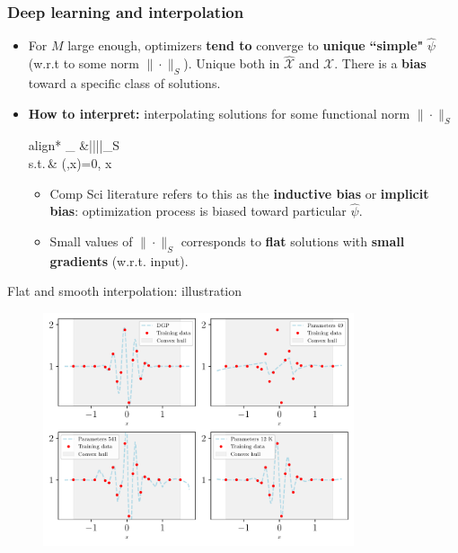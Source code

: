 \documentclass[aspectratio=169,10pt]{beamer}
\newcommand{\emphcolor}[1]{\textbf{\textcolor{emphcolorval}{#1}}}
\newcommand{\Xdom}{\mathcal{X}}
\newcommand{\Xtrain}{\hat{\mathcal{X}}}
\newcommand{\st}{\textrm{s.t.}\,}
\begin{document}
\begin{frame}
	\frametitle{Deep learning and interpolation}
	\begin{itemize}
		\item For $M$ large enough, optimizers \emphcolor{tend to} converge to \emphcolor{unique} \emphcolor{``simple"}  $\hat{\psi}$ (w.r.t to some norm $\|\cdot\|_S$). Unique both in $\Xtrain$ and $\Xdom$. There is a \emphcolor{bias} toward a specific class of solutions.
		\medskip
		\item \emphcolor{How to interpret:} interpolating solutions for some functional norm $\|\cdot\|_S$
		\begin{empheq}[box=\tcbhighmath]{align*}
			\min_{\hat{\psi}\in {}} &||\hat{\psi}||_S\\
			\st & \ell(\hat{\psi},x)=0,\quad {} x \in \Xtrain
		\end{empheq}
		\vspace{-0.1in}
		
		\begin{itemize}
			\item Comp Sci literature refers to this as the \emphcolor{inductive bias} or \emphcolor{implicit bias}: optimization process is biased toward particular $\hat{\psi}$.\smallskip
			\item Small values of $\|\cdot\|_S$ corresponds to \emphcolor{flat} solutions with \emphcolor{small gradients} (w.r.t. input).
			\smallskip
		\end{itemize}
	\end{itemize}
\end{frame}


\begin{frame}{Flat and smooth interpolation:  illustration}
	\begin{figure}[h!]
		\begin{center}
			\includegraphics[height=2.7in]{./figures/fourplots_example_reg.pdf}
		\end{center}
	\end{figure}

\end{frame}
\end{document}
